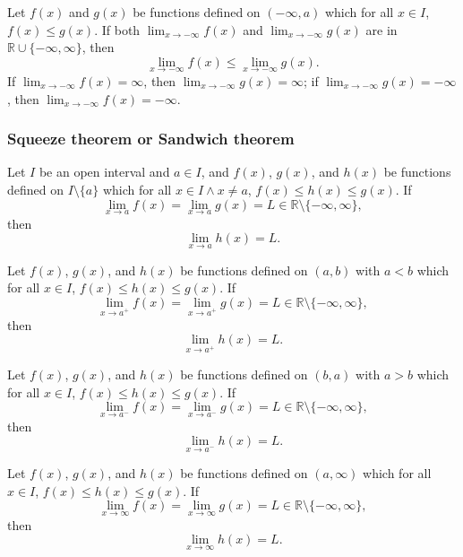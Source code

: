 \documentclass[a4paper,12pt]{report}
\begin{document}
Let $f(x)$ and $g(x)$ be functions defined on $(-\infty,a)$ which for all $x\in I$, $f(x)\leq g(x)$. If both $\lim_{x\to-\infty}f(x)$ and $\lim_{x\to-\infty}g(x)$ are in $\mathbb{R}\cup\{-\infty,\infty\}$, then
\[\lim_{x\to-\infty}f(x)\leq\lim_{x\to-\infty}g(x).\]
If $\lim_{x\to-\infty}f(x)=\infty$, then $\lim_{x\to-\infty}g(x)=\infty$; if $\lim_{x\to-\infty}g(x)=-\infty$, then $\lim_{x\to-\infty}f(x)=-\infty$.
\subsubsection{Squeeze theorem or Sandwich theorem}
Let $I$ be an open interval and $a\in I$, and $f(x)$, $g(x)$, and $h(x)$ be functions defined on $I\setminus\{a\}$ which for all $x\in I\land x\neq a$, $f(x)\leq h(x)\leq g(x)$. If
\[\lim_{x\to a}f(x)=\lim_{x\to a}g(x)=L\in\mathbb{R}\setminus\{-\infty,\infty\},\]
then
\[\lim_{x\to a}h(x)=L.\]

Let $f(x)$, $g(x)$, and $h(x)$ be functions defined on $(a,b)$ with $a<b$ which for all $x\in I$, $f(x)\leq h(x)\leq g(x)$. If
\[\lim_{x\to a^+}f(x)=\lim_{x\to a^+}g(x)=L\in\mathbb{R}\setminus\{-\infty,\infty\},\]
then
\[\lim_{x\to a^+}h(x)=L.\]

Let $f(x)$, $g(x)$, and $h(x)$ be functions defined on $(b,a)$ with $a>b$ which for all $x\in I$, $f(x)\leq h(x)\leq g(x)$. If
\[\lim_{x\to a^-}f(x)=\lim_{x\to a^-}g(x)=L\in\mathbb{R}\setminus\{-\infty,\infty\},\]
then
\[\lim_{x\to a^-}h(x)=L.\]

Let $f(x)$, $g(x)$, and $h(x)$ be functions defined on $(a,\infty)$ which for all $x\in I$, $f(x)\leq h(x)\leq g(x)$. If
\[\lim_{x\to\infty}f(x)=\lim_{x\to\infty}g(x)=L\in\mathbb{R}\setminus\{-\infty,\infty\},\]
then
\[\lim_{x\to\infty}h(x)=L.\]
\end{document}
